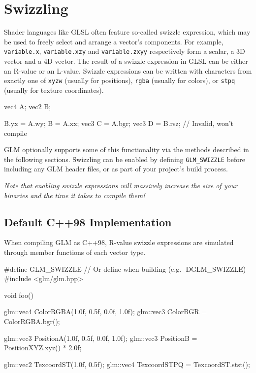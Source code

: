 \documentclass{scrartcl}
\numberwithin{figure}{subsection}
\begin{document}
\newpage{}

\section{Swizzling}

Shader languages like GLSL often feature so-called swizzle expression, which may be used to freely select and arrange a vector's components. For example, \verb|variable.x|, \verb|variable.xzy| and \verb|variable.zxyy| respectively form a scalar, a 3D vector and a 4D vector.  The result of a swizzle expression in GLSL can be either an R-value or an L-value. Swizzle expressions can be written with characters from exactly one of \verb|xyzw| (usually for positions), \verb|rgba| (usually for colors), or \verb|stpq| (usually for texture coordinates).

\begin{glslcode}
vec4 A;
vec2 B;

B.yx = A.wy;
B = A.xx;
vec3 C = A.bgr;
vec3 D = B.rsz; // Invalid, won't compile
\end{glslcode}

GLM optionally supports some of this functionality via the methods described in the following sections. Swizzling can be enabled by defining \verb|GLM_SWIZZLE| before including any GLM header files, or as part of your project's build process.

\emph{Note that enabling swizzle expressions will massively increase the size of your binaries and the time it takes to compile them!}

\subsection{Default C++98 Implementation}

When compiling GLM as C++98, R-value swizzle expressions are simulated through member functions of each vector type.

\begin{cppcode}
#define GLM_SWIZZLE // Or define when building (e.g. -DGLM_SWIZZLE)
#include <glm/glm.hpp>

void foo()
{
  glm::vec4 ColorRGBA(1.0f, 0.5f, 0.0f, 1.0f);
  glm::vec3 ColorBGR = ColorRGBA.bgr();

  glm::vec3 PositionA(1.0f, 0.5f, 0.0f, 1.0f);
  glm::vec3 PositionB = PositionXYZ.xyz() * 2.0f;

  glm::vec2 TexcoordST(1.0f, 0.5f);
  glm::vec4 TexcoordSTPQ = TexcoordST.stst();
}
\end{cppcode}
\end{document}

